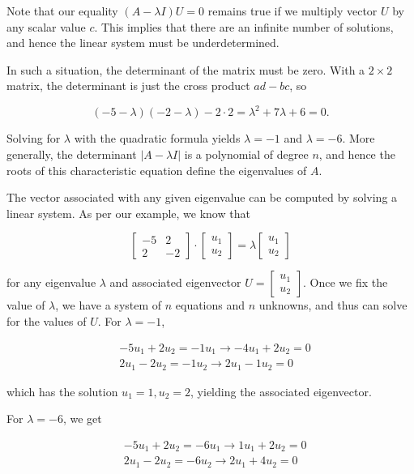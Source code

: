 \documentclass[10pt]{article}
\begin{document}
Note that our equality \((A-\lambda I) U=0\) remains true if we multiply vector \(U\) by any scalar value \(c\). This implies that there are an infinite number of solutions, and hence the linear system must be underdetermined.

In such a situation, the determinant of the matrix must be zero. With a \(2 \times 2\) matrix, the determinant is just the cross product \(ad-bc\), so

\[
(-5-\lambda)(-2-\lambda)-2 \cdot 2=\lambda^{2}+7\lambda+6=0.
\]

Solving for \(\lambda\) with the quadratic formula yields \(\lambda=-1\) and \(\lambda=-6\). More generally, the determinant \(|A-\lambda I|\) is a polynomial of degree \(n\), and hence the roots of this characteristic equation define the eigenvalues of \(A\).

The vector associated with any given eigenvalue can be computed by solving a linear system. As per our example, we know that

\[
\begin{bmatrix}
-5 & 2 \\
2 & -2
\end{bmatrix} \cdot
\begin{bmatrix}
u_{1} \\
u_{2}
\end{bmatrix} = \lambda
\begin{bmatrix}
u_{1} \\
u_{2}
\end{bmatrix}
\]

for any eigenvalue \(\lambda\) and associated eigenvector \(U=\begin{bmatrix} u_{1} \\ u_{2} \end{bmatrix}\). Once we fix the value of \(\lambda\), we have a system of \(n\) equations and \(n\) unknowns, and thus can solve for the values of \(U\). For \(\lambda=-1\),

\[
\begin{aligned}
& -5u_{1}+2u_{2}=-1u_{1} \rightarrow -4u_{1}+2u_{2}=0 \\
& 2u_{1}-2u_{2}=-1u_{2} \rightarrow 2u_{1}-1u_{2}=0
\end{aligned}
\]

which has the solution \(u_{1}=1, u_{2}=2\), yielding the associated eigenvector.

For \(\lambda=-6\), we get

\[
\begin{aligned}
& -5u_{1}+2u_{2}=-6u_{1} \rightarrow 1u_{1}+2u_{2}=0 \\
& 2u_{1}-2u_{2}=-6u_{2} \rightarrow 2u_{1}+4u_{2}=0
\end{aligned}
\]
\end{document}
